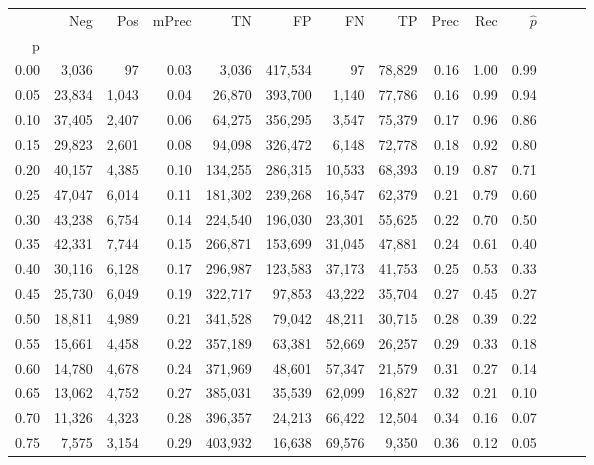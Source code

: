 \begin{tabular}{rrrrrrrrrrrrrr}
\toprule
{} &     Neg &    Pos & mPrec &       TN &       FP &      FN &      TP &  Prec &   Rec & $\hat{p}$ \\
p    &         &        &       &          &          &         &         &       &       &           \\
\midrule
0.00 &   3,036 &     97 &  0.03 &    3,036 &  417,534 &      97 &  78,829 &  0.16 &  1.00 &      0.99 \\
0.05 &  23,834 &  1,043 &  0.04 &   26,870 &  393,700 &   1,140 &  77,786 &  0.16 &  0.99 &      0.94 \\
0.10 &  37,405 &  2,407 &  0.06 &   64,275 &  356,295 &   3,547 &  75,379 &  0.17 &  0.96 &      0.86 \\
0.15 &  29,823 &  2,601 &  0.08 &   94,098 &  326,472 &   6,148 &  72,778 &  0.18 &  0.92 &      0.80 \\
0.20 &  40,157 &  4,385 &  0.10 &  134,255 &  286,315 &  10,533 &  68,393 &  0.19 &  0.87 &      0.71 \\
0.25 &  47,047 &  6,014 &  0.11 &  181,302 &  239,268 &  16,547 &  62,379 &  0.21 &  0.79 &      0.60 \\
0.30 &  43,238 &  6,754 &  0.14 &  224,540 &  196,030 &  23,301 &  55,625 &  0.22 &  0.70 &      0.50 \\
0.35 &  42,331 &  7,744 &  0.15 &  266,871 &  153,699 &  31,045 &  47,881 &  0.24 &  0.61 &      0.40 \\
0.40 &  30,116 &  6,128 &  0.17 &  296,987 &  123,583 &  37,173 &  41,753 &  0.25 &  0.53 &      0.33 \\
0.45 &  25,730 &  6,049 &  0.19 &  322,717 &   97,853 &  43,222 &  35,704 &  0.27 &  0.45 &      0.27 \\
0.50 &  18,811 &  4,989 &  0.21 &  341,528 &   79,042 &  48,211 &  30,715 &  0.28 &  0.39 &      0.22 \\
0.55 &  15,661 &  4,458 &  0.22 &  357,189 &   63,381 &  52,669 &  26,257 &  0.29 &  0.33 &      0.18 \\
0.60 &  14,780 &  4,678 &  0.24 &  371,969 &   48,601 &  57,347 &  21,579 &  0.31 &  0.27 &      0.14 \\
0.65 &  13,062 &  4,752 &  0.27 &  385,031 &   35,539 &  62,099 &  16,827 &  0.32 &  0.21 &      0.10 \\
0.70 &  11,326 &  4,323 &  0.28 &  396,357 &   24,213 &  66,422 &  12,504 &  0.34 &  0.16 &      0.07 \\
0.75 &   7,575 &  3,154 &  0.29 &  403,932 &   16,638 &  69,576 &   9,350 &  0.36 &  0.12 &      0.05 \\

\end{tabular}
